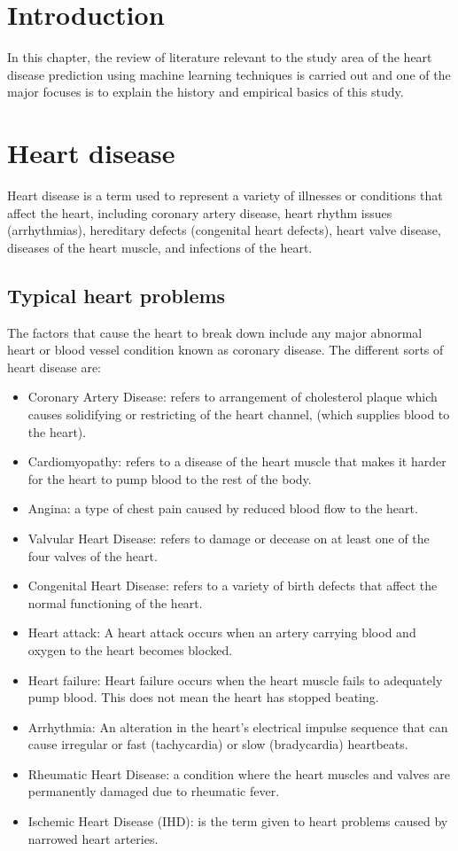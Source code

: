 \section{Introduction}
In this chapter, the review of literature relevant to the study area of the heart disease prediction using machine learning techniques is carried out and one of the major focuses is to explain the history and empirical basics of this study.

\section{Heart disease}
Heart disease is a term used to represent a variety of illnesses or conditions that affect the heart, including coronary artery disease, heart rhythm issues (arrhythmias), hereditary defects (congenital heart defects), heart valve disease, diseases of the heart muscle, and infections of the heart.

\subsection{Typical heart problems}

The factors that cause the heart to break down include any major abnormal heart or blood vessel condition known as coronary disease. The different sorts of heart disease are:

\begin{itemize}
	\item{Coronary Artery Disease: refers to arrangement of cholesterol plaque which causes solidifying or restricting of the heart channel, (which supplies blood to the heart).}
	\item{Cardiomyopathy: refers to a disease of the heart muscle that makes it harder for the heart to pump blood to the rest of the body.}
	\item{Angina: a type of chest pain caused by reduced blood flow to the heart.}
	\item{Valvular Heart Disease: refers to damage or decease on at least one of the four valves of the heart.}
	\item{Congenital Heart Disease: refers to a variety of birth defects that affect the normal functioning of the heart.}
	\item{Heart attack: A heart attack occurs when an artery carrying blood and oxygen to the heart becomes blocked.}
	\item {Heart failure: Heart failure occurs when the heart muscle fails to adequately pump blood. This does not mean the heart has stopped beating. }
	\item{Arrhythmia: An alteration in the heart's electrical impulse sequence that can cause irregular or fast (tachycardia) or slow (bradycardia) heartbeats. }
	\item{Rheumatic Heart Disease: a condition where the heart muscles and valves are permanently damaged due to rheumatic fever.}
	
	\item{Ischemic Heart Disease (IHD): is the term given to heart problems caused by narrowed heart arteries.}
	
\end{itemize}

